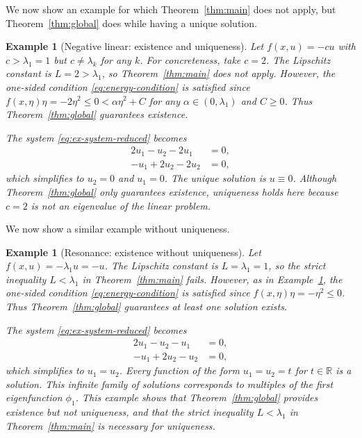 \documentclass{article}
\newtheorem{example}[theorem]{Example}
\numberwithin{equation}{section}
\numberwithin{theorem}{section}
\begin{document}
We now show an example for which Theorem~\ref{thm:main} does not apply, but Theorem~\ref{thm:global} does while having a unique solution.
\begin{example}[Negative linear: existence and uniqueness]\label{ex:negative-linear}
Let $f(x, u) = -cu$ with $c > \lambda_1 = 1$ but $c \neq \lambda_k$ for any $k$. For concreteness, take $c = 2$. The Lipschitz constant is $L = 2 > \lambda_1$, so Theorem~\ref{thm:main} does not apply. However, the one-sided condition \eqref{eq:energy-condition} is satisfied since $f(x, \eta)\eta = -2\eta^2 \leq 0 < \alpha\eta^2 + C$ for any $\alpha \in (0, \lambda_1)$ and $C \geq 0$. Thus Theorem~\ref{thm:global} guarantees existence.

The system \eqref{eq:ex-system-reduced} becomes
\[\begin{aligned}
2u_1 - u_2 - 2u_1 &= 0,\\
-u_1 + 2u_2 - 2u_2 &= 0,
\end{aligned}\]
which simplifies to $u_2 = 0$ and $u_1 = 0$. The unique solution is $u \equiv 0$. Although Theorem~\ref{thm:global} only guarantees existence, uniqueness holds here because $c = 2$ is not an eigenvalue of the linear problem.
\end{example}
We now show a similar example without uniqueness.
\begin{example}[Resonance: existence without uniqueness]\label{ex:resonance}
Let $f(x, u) = -\lambda_1 u = -u$. The Lipschitz constant is $L = \lambda_1 = 1$, so the strict inequality $L < \lambda_1$ in Theorem~\ref{thm:main} fails. However, as in Example~\ref{ex:negative-linear}, the one-sided condition \eqref{eq:energy-condition} is satisfied since $f(x, \eta)\eta = -\eta^2 \leq 0$. Thus Theorem~\ref{thm:global} guarantees at least one solution exists.

The system \eqref{eq:ex-system-reduced} becomes
\[\begin{aligned}
2u_1 - u_2 - u_1 &= 0,\\
-u_1 + 2u_2 - u_2 &= 0,
\end{aligned}\]
which simplifies to $u_1 = u_2$. Every function of the form $u_1 = u_2 = t$ for $t \in \mathbb{R}$ is a solution. This infinite family of solutions corresponds to multiples of the first eigenfunction $\phi_1$. This example shows that Theorem~\ref{thm:global} provides existence but not uniqueness, and that the strict inequality $L < \lambda_1$ in Theorem~\ref{thm:main} is necessary for uniqueness.
\end{example}
\end{document}

